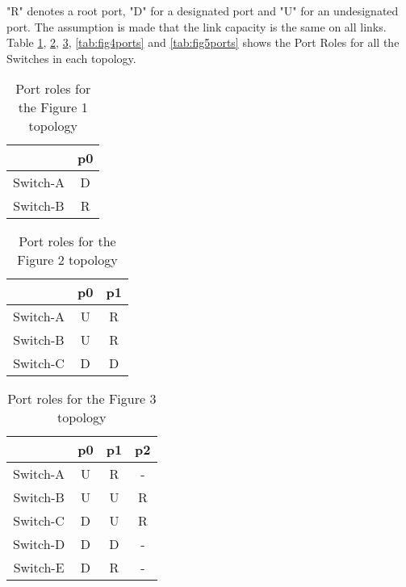 \documentclass{article}
\begin{document}
"R" denotes a root port, "D" for a designated port and "U" for an undesignated port. The assumption is made that the link capacity is the same on all links. Table \ref{tab:fig1ports}, \ref{tab:fig2ports}, \ref{tab:fig3ports}, \ref{tab:fig4ports} and \ref{tab:fig5ports} shows the Port Roles for all the Switches in each topology.

\begin{table}[!h]
      \centering
    \begin{tabular}{|c|c|}
    \hline
         & p0           \\
    \hline
    Switch-A &      D     \\ 
    Switch-B &       R  \\
    \hline
    \end{tabular}
    \caption{Port roles for the Figure 1 topology}
    \label{tab:fig1ports}
\end{table}

\begin{table}[!h]
      \centering
    \begin{tabular}{|c|c|c|}
    \hline
         & p0 & p1       \\
    \hline
    Switch-A &  U & R      \\ 
    Switch-B &  U & R      \\
    Switch-C & D & D      \\
    \hline
    \end{tabular}
    \caption{Port roles for the Figure 2 topology}
    \label{tab:fig2ports}
\end{table}


\begin{table}[!h]
      \centering
    \begin{tabular}{|c|c|c|c|}
    \hline
         & p0 & p1 & p2 \\
    \hline
    Switch-A &  U & R & -    \\ 
    Switch-B & U  & U & R       \\
    Switch-C & D  & U & R       \\
    Switch-D &   D & D & -       \\
    Switch-E &   D  & R & -     \\
    \hline
    \end{tabular}
    \caption{Port roles for the Figure 3 topology}
    \label{tab:fig3ports}
\end{table}
\end{document}
